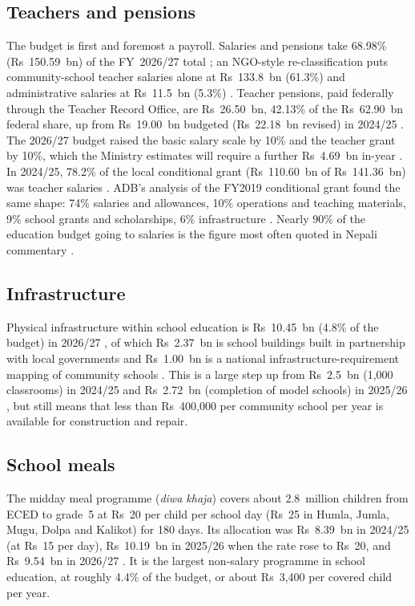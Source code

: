 \documentclass[11pt,a4paper]{article}
\begin{document}
\subsection{Teachers and pensions}
The budget is first and foremost a payroll. Salaries and pensions take 68.98\% (Rs~150.59~bn) of the FY~2026/27 total \cite{ratopati2026}; an NGO-style re-classification puts community-school teacher salaries alone at Rs~133.8~bn (61.3\%) and administrative salaries at Rs~11.5~bn (5.3\%) \cite{onlinekhabar2026,khabarhub2026}. Teacher pensions, paid federally through the Teacher Record Office, are Rs~26.50~bn, 42.13\% of the Rs~62.90~bn federal share, up from Rs~19.00~bn budgeted (Rs~22.18~bn revised) in 2024/25 \cite{ratopati2026,nce2025,kp2024dec}. The 2026/27 budget raised the basic salary scale by 10\% and the teacher grant by 10\%, which the Ministry estimates will require a further Rs~4.69~bn in-year \cite{mof2026,ratopati_pay2026}. In 2024/25, 78.2\% of the local conditional grant (Rs~110.60~bn of Rs~141.36~bn) was teacher salaries \cite{kp2024dec}. ADB's analysis of the FY2019 conditional grant found the same shape: 74\% salaries and allowances, 10\% operations and teaching materials, 9\% school grants and scholarships, 6\% infrastructure \cite{adb2021}. Nearly 90\% of the education budget going to salaries is the figure most often quoted in Nepali commentary \cite{kpedit2026}.

\subsection{Infrastructure}
Physical infrastructure within school education is Rs~10.45~bn (4.8\% of the budget) in 2026/27 \cite{radionepal2026}, of which Rs~2.37~bn is school buildings built in partnership with local governments and Rs~1.00~bn is a national infrastructure-requirement mapping of community schools \cite{republica_budget2026,mof2026}. This is a large step up from Rs~2.5~bn (1,000 classrooms) in 2024/25 and Rs~2.72~bn (completion of model schools) in 2025/26 \cite{edusanjal2024b,edusanjal2025}, but still means that less than Rs~400,000 per community school per year is available for construction and repair.

\subsection{School meals}
The midday meal programme (\emph{diwa khaja}) covers about 2.8~million children from ECED to grade~5 at Rs~20 per child per school day (Rs~25 in Humla, Jumla, Mugu, Dolpa and Kalikot) for 180 days. Its allocation was Rs~8.39~bn in 2024/25 (at Rs~15 per day), Rs~10.19~bn in 2025/26 when the rate rose to Rs~20, and Rs~9.54~bn in 2026/27 \cite{edusanjal2024b,edusanjal2025,republica_meals2026}. It is the largest non-salary programme in school education, at roughly 4.4\% of the budget, or about Rs~3,400 per covered child per year.
\end{document}
